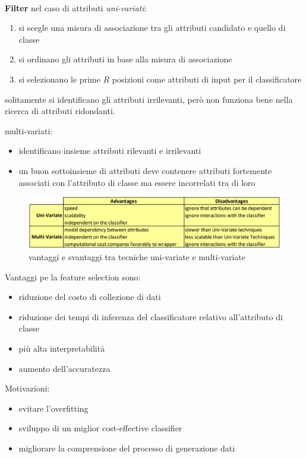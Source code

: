 \\
\textbf{Filter} nel caso di attributi \textit{uni-variati}: 
\begin{enumerate}
	\item si scegle una misura di associazione tra gli attributi candidato e quello di classe
	\item si ordinano gli attributi in base alla misura di associazione
	\item si selezionano le prime $R$ posizioni come attributi di input per il classificatore
\end{enumerate}
solitamente si identificano gli attributi irrilevanti, per\`o non funziona bene nella ricerca di attributi ridondanti.

multi-variati:
\begin{itemize}
	\item identificano insieme attributi rilevanti e irrilevanti
	\item un buon sottoinsieme di attributi deve contenere attributi fortemente associati con l'attributo di classe ma essere incorrelati tra di loro
\end{itemize}

\begin{figure}[h!]
	\centering
	\includegraphics[height=0.22 \linewidth]{classification/pict/filter_uni_multi.png}
	\caption{vantaggi e svantaggi tra tecniche uni-variate e multi-variate}
\end{figure}

Vantaggi pe la feature selection sono:
\begin{itemize}
	\item riduzione del costo di collezione di dati
	\item riduzione dei tempi di inferenza del classificatore relativo all'attributo di classe
	\item pi\`u alta interpretabilit\`a
	\item aumento dell'accuratezza
\end{itemize}
Motivazioni:
\begin{itemize}
	\item evitare l'overfitting
	\item sviluppo di un miglior cost-effective classifier
	\item migliorare la comprensione del processo di generazione dati
\end{itemize}

